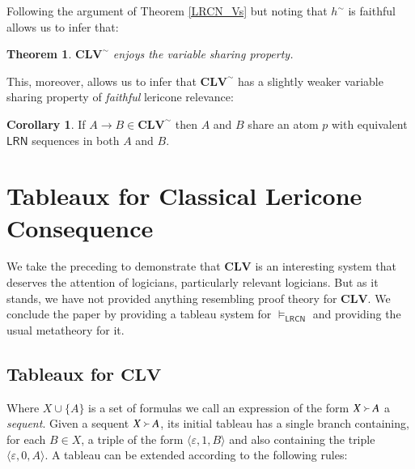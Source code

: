 \documentclass{amsart}
\newtheorem{theorem}{Theorem}
\theoremstyle{definition}
\newtheorem{cor}{Corollary}
\newcommand{\LRN}{\mathsf{LRN}}
\newcommand{\LRCN}{\mathsf{LRCN}}
\newcommand{\CLV}{\mathbf{CLV}}
\begin{document}
\noindent Following the argument of Theorem \ref{LRCN_Vs} but noting that $h^{\sim}$ is faithful allows us to infer that:

\begin{theorem}
    $\mathbf{CLV}^{\sim}$ enjoys the variable sharing property.
\end{theorem}

\noindent This, moreover, allows us to infer that $\mathbf{CLV}^{\sim}$ has a slightly weaker variable sharing property of \emph{faithful} lericone relevance:

\begin{cor}
    If $A\rightarrow B\in\mathbf{CLV}^{\sim}$ then $A$ and $B$ share an atom $p$ with equivalent $\LRN$ sequences in both $A$ and $B$.
\end{cor}





\section{Tableaux for Classical Lericone Consequence}\label{Section:Tableaux}

We take the preceding to demonstrate that $\CLV$ is an interesting system that deserves the attention of logicians, particularly relevant logicians. But as it stands, we have not provided anything resembling proof theory for $\CLV$. We conclude the paper by providing a tableau system for $\vDash_{\LRCN}$ and providing the usual metatheory for it. 

\subsection{Tableaux for $\CLV$}

Where $X\cup\{A\}$ is a set of formulas we call an expression of the form $X\Yright A$ a \textit{sequent}. Given a sequent $X\Yright A$, its initial tableau has a single branch containing, for each $B\in X$, a triple of the form $\langle \varepsilon,1,B\rangle$ and also containing the triple $\langle \varepsilon,0,A\rangle$. A tableau can be extended according to the following rules:
\end{document}
